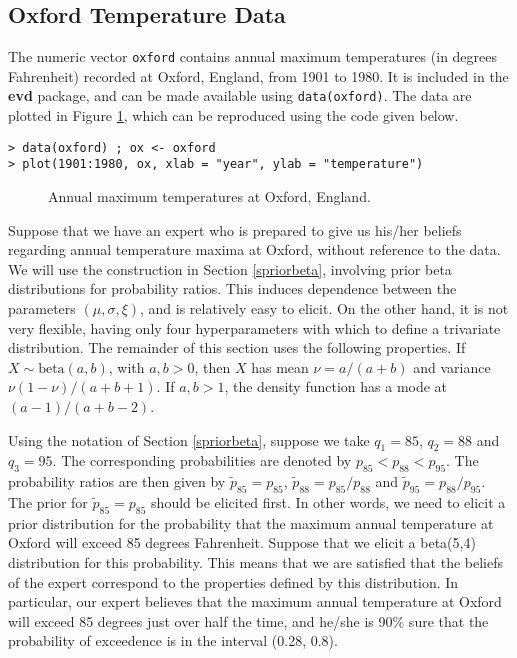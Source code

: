 \documentclass[11pt,a4paper]{article}
\begin{document}
\subsection{Oxford Temperature Data}
\label{egoxford}

The numeric vector \verb+oxford+ contains annual maximum temperatures
(in degrees Fahrenheit) recorded at Oxford, England, from 1901 to
1980.  It is included in the \textbf{evd} package, and can be made
available using \verb+data(oxford)+.  The data are plotted in Figure
\ref{oxdata}, which can be reproduced using the code given below.

\begin{verbatim}
> data(oxford) ; ox <- oxford
> plot(1901:1980, ox, xlab = "year", ylab = "temperature")
\end{verbatim}

\begin{figure}
\begin{center}
\vspace{-1.5cm}
\end{center}
\caption{Annual maximum temperatures at Oxford, England.}
\label{oxdata}
\end{figure}

Suppose that we have an expert who is prepared to give us his/her
beliefs regarding annual temperature maxima at Oxford, without
reference to the data.  We will use the construction in Section
\ref{spriorbeta}, involving prior beta distributions for probability
ratios.  This induces dependence between the parameters
$(\mu,\sigma,\xi)$, and is relatively easy to elicit.  On the other
hand, it is not very flexible, having only four hyperparameters with
which to define a trivariate distribution.  The remainder of this
section uses the following properties.  If $X \sim \text{beta}(a,b)$,
with $a,b>0$, then $X$ has mean $\nu = a/(a+b)$ and variance
$\nu(1-\nu)/(a+b+1)$.  If $a,b>1$, the density function has a mode at
$(a-1)/(a+b-2)$.

Using the notation of Section \ref{spriorbeta}, suppose we take $q_1 =
85$, $q_2 = 88$ and $q_3 = 95$.  The corresponding probabilities are
denoted by $p_{85} < p_{88} < p_{95}$.  The probability ratios are
then given by $\tilde{p}_{85} = p_{85}$, $\tilde{p}_{88} =
p_{85}/p_{88}$ and $\tilde{p}_{95} = p_{88}/p_{95}$.  The prior for
$\tilde{p}_{85} = p_{85}$ should be elicited first.  In other words,
we need to elicit a prior distribution for the probability that the
maximum annual temperature at Oxford will exceed 85 degrees
Fahrenheit.  Suppose that we elicit a beta(5,4) distribution for this
probability.  This means that we are satisfied that the beliefs of the
expert correspond to the properties defined by this distribution.  In
particular, our expert believes that the maximum annual temperature at
Oxford will exceed 85 degrees just over half the time, and he/she is
90\% sure that the probability of exceedence is in the interval (0.28,
0.8).
\end{document}

